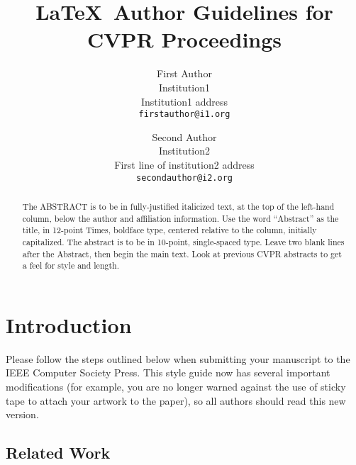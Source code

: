 \documentclass[10pt,twocolumn,letterpaper]{article}
\begin{document}
\title{\LaTeX\ Author Guidelines for CVPR Proceedings}

\author{First Author\\
Institution1\\
Institution1 address\\
{\tt\small firstauthor@i1.org}
\and
Second Author\\
Institution2\\
First line of institution2 address\\
{\tt\small secondauthor@i2.org}
}

\maketitle

\begin{abstract}
   The ABSTRACT is to be in fully-justified italicized text, at the top
   of the left-hand column, below the author and affiliation
   information. Use the word ``Abstract'' as the title, in 12-point
   Times, boldface type, centered relative to the column, initially
   capitalized. The abstract is to be in 10-point, single-spaced type.
   Leave two blank lines after the Abstract, then begin the main text.
   Look at previous CVPR abstracts to get a feel for style and length.
\end{abstract}

\section{Introduction}

Please follow the steps outlined below when submitting your manuscript to
the IEEE Computer Society Press.  This style guide now has several
important modifications (for example, you are no longer warned against the
use of sticky tape to attach your artwork to the paper), so all authors
should read this new version.


\subsection{Related Work}
\end{document}
